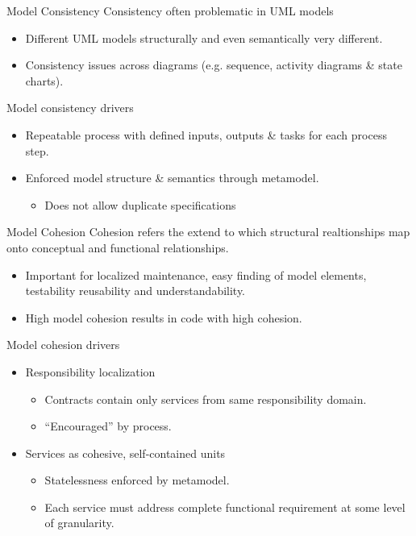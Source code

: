\begin{frame}{Model Consistency}
  Consistency often problematic in UML models
    \begin{itemize}
     \item Different UML models structurally and even semantically very different.
     \item Consistency issues across diagrams (e.g. sequence, activity diagrams \& state charts).
    \end{itemize}
  \pause
  \begin{block}{Model consistency drivers}
    \begin{itemize}
      \item<+-| alert@+> Repeatable process with defined inputs, outputs \& tasks for each process step.
      \item<+-| alert@+> Enforced model structure \& semantics through metamodel.
		  \begin{itemize}
			\item Does not allow duplicate specifications
		  \end{itemize}
    \end{itemize}
  \end{block}
\end{frame}


\begin{frame}{Model Cohesion}
  Cohesion refers the extend to which structural realtionships map onto conceptual and functional relationships.
    \begin{itemize}
     \item Important for localized maintenance, easy finding of model elements, testability reusability and understandability.
     \item High model cohesion results in code with high cohesion.
    \end{itemize}
  \pause
  \begin{block}{Model cohesion drivers}
	 \begin{itemize}
	 \item<+-| alert@+> Responsibility localization
		  \begin{itemize}
			 \item Contracts contain only services from same responsibility domain.
			 \item ``Encouraged'' by process.
		  \end{itemize}
	 \item<+-| alert@+> Services as cohesive, self-contained units
		  \begin{itemize}
			 \item Statelessness enforced by metamodel.
			 \item Each service must address complete functional requirement at some level of granularity.
		  \end{itemize}
	 \end{itemize}
  \end{block}
\end{frame}

